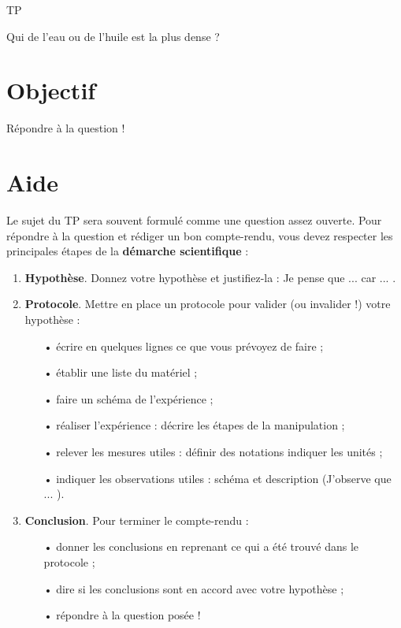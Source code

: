 
\cfoot{} %



\begin{header}
TP

Qui de l'eau ou de l'huile est la plus dense ?
\end{header}

\section*{Objectif}

Répondre à la question !

\section*{Aide}

Le sujet du TP sera souvent formulé comme une question assez ouverte.
Pour répondre à la question et rédiger un bon compte-rendu, vous devez respecter les principales étapes de la \textbf{démarche scientifique} :
\begin{enumerate}
\item \textbf{Hypothèse}.
Donnez votre hypothèse et justifiez-la : \og Je pense que ... car ... \fg{}.
\item \textbf{Protocole}.
Mettre en place un protocole pour valider (ou invalider !) votre hypothèse :
\begin{itemize}
\item[•] écrire en quelques lignes ce que vous prévoyez de faire ;
\item[•] établir une liste du matériel ;
\item[•] faire un schéma de l'expérience ;
\item[•] réaliser l'expérience : décrire les étapes de la manipulation ;
\item[•] relever les mesures utiles : définir des notations indiquer les unités ;
\item[•] indiquer les observations utiles : schéma et description (\og J'observe que ... \fg{}).
\end{itemize}
\item \textbf{Conclusion}. Pour terminer le compte-rendu :
\begin{itemize}
\item[•] donner les conclusions en reprenant ce qui a été trouvé dans le protocole ;
\item[•] dire si les conclusions sont en accord avec votre hypothèse ;
\item[•] répondre à la question posée !
\end{itemize}
\end{enumerate}

